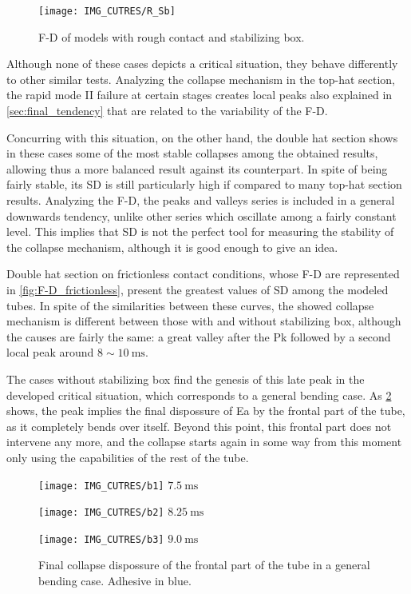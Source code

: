 \documentclass[cmfonts]{witpress}
\begin{document}
\begin{figure}
	\centering
	\texttt{[image: IMG\_CUTRES/R\_Sb]}
	\caption{F-D of models with rough contact and stabilizing box.}
	\label{fig:R_Sb}
\end{figure}

Although none of these cases depicts a critical situation, they behave differently to other similar tests. Analyzing the collapse mechanism in the top-hat section, the rapid mode II failure at certain stages creates local peaks also explained in \cref{sec:final_tendency} that are related to the variability of the F-D.

Concurring with this situation, on the other hand, the double hat section shows in these cases some of the most stable collapses among the obtained results, allowing thus a more balanced result against its counterpart. In spite of being fairly stable, its SD is still particularly high if compared to many top-hat section results. Analyzing the F-D, the peaks and valleys series is included in a general downwards tendency, unlike other series which oscillate among a fairly constant level. This implies that SD is not the perfect tool for measuring the stability of the collapse mechanism, although it is good enough to give an idea.

Double hat section on frictionless contact conditions, whose F-D are represented in \cref{fig:F-D_frictionless}, present the greatest values of SD among the modeled tubes. In spite of the similarities between these curves, the showed collapse mechanism is different between those with and without stabilizing box, although the causes are fairly the same: a great valley after the Pk followed by a second local peak around $\num{8}\sim\SI{10}{\ms}$.

The cases without stabilizing box find the genesis of this late peak in the developed critical situation, which corresponds to a general bending case. As \cref{fig:gen_bend_weakening} shows, the peak implies the final dispossure of Ea by the frontal part of the tube, as it completely bends over itself. Beyond this point, this frontal part does not intervene any more, and the collapse starts again in some way from this moment only using the capabilities of the rest of the tube.

\begin{figure}
	\centering
	\begin{minipage}[b]{.3\linewidth}
		\centering
		\texttt{[image: IMG\_CUTRES/b1]}
		$\SI{7.5}{\ms}$
	\end{minipage}
	\quad
	\begin{minipage}[b]{.3\linewidth}
		\centering
		\texttt{[image: IMG\_CUTRES/b2]}
		$\SI{8.25}{\ms}$
	\end{minipage}
	\quad
	\begin{minipage}[b]{.3\linewidth}
		\centering
		\texttt{[image: IMG\_CUTRES/b3]}
		$\SI{9.0}{\ms}$
	\end{minipage}
	\caption[Final collapse dispossure of the frontal part of the tube in a general bending case.]{Final collapse dispossure of the frontal part of the tube in a general bending case. Adhesive in blue.}
	\label{fig:gen_bend_weakening}
\end{figure}
\end{document}
